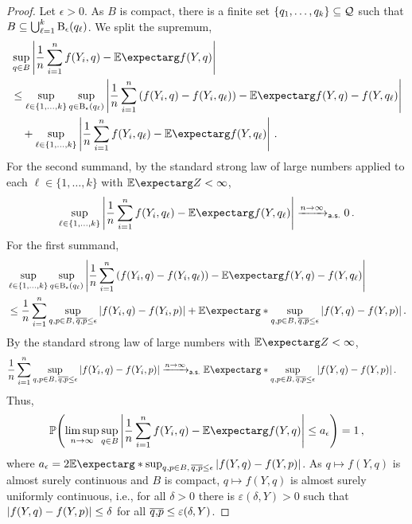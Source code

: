 \begin{proof}
Let $\epsilon > 0$. As $B$ is compact, there is a finite set $\left\lbrace q_1, \dots, q_k \right\rbrace \subseteq \mathcal{Q}$ such that $B \subseteq \bigcup_{\ell=1}^k\operatorname{\mathrm{B}}_\epsilon(q_\ell)$. We split the supremum,
\begin{align*}
	&\sup_{q\in B} \abs{\frac 1n \sum_{i=1}^n f(Y_i, q) - \Ex{f(Y, q)}}
	\\&\leq
	\sup_{\ell \in \cb{1,\dots, k}} 
	\sup_{q\in \ball_\epsilon(q_\ell)}  
		\abs{\frac 1n \sum_{i=1}^n \br{f(Y_i, q) - f(Y_i, q_\ell)} - \Ex{f(Y, q) - f(Y, q_\ell)}} 
	\\&\quad+ 
	\sup_{\ell \in \cb{1,\dots, k}} \abs{\frac 1n \sum_{i=1}^n f(Y_i, q_\ell) - \Ex{f(Y, q_\ell)}}
	\eqfs
\end{align*}
For the second summand, by the standard strong law of large numbers applied to each $\ell\in\{1,\dots,k\}$ with $\Ex{Z} < \infty$, 
\begin{align*}
\sup_{\ell \in \cb{1,\dots, k}} \abs{\frac 1n \sum_{i=1}^n f(Y_i, q_\ell) - \Ex{f(Y, q_\ell)}} \xrightarrow{n \to \infty}_{\ms{a.s.}} 0
\eqfs
\end{align*}
For the first summand,
\begin{align*}
	&\sup_{\ell \in \cb{1,\dots, k}} 
	\sup_{q\in \ball_\epsilon(q_\ell)}  
		\abs{\frac 1n \sum_{i=1}^n \br{f(Y_i, q) - f(Y_i, q_\ell)} - \Ex{f(Y, q) - f(Y, q_\ell)}} 
	\\& \leq
	\frac 1n \sum_{i=1}^n \sup_{q,p\in B,\, \sol qp \leq \epsilon} \abs{f(Y_i, q) - f(Y_i, p)} 
	+ 
	\Ex*{\sup_{q,p\in B,\, \sol qp \leq \epsilon} \abs{f(Y, q) - f(Y, p)}} 
	\eqfs
\end{align*}
By the standard strong law of large numbers with $\Ex{Z} < \infty$, 
\begin{align*}
	\frac 1n \sum_{i=1}^n \sup_{q,p\in B,\, \sol qp \leq \epsilon} \abs{f(Y_i, q) - f(Y_i, p)} 
	&\xrightarrow{n \to \infty}_{\ms{a.s.}} 
	\Ex*{\sup_{q,p\in B,\, \sol qp \leq \epsilon} \abs{f(Y, q) - f(Y, p)} }
	\eqfs
\end{align*}
Thus,
\begin{equation}\label{eq:ulln:as_limsup}
	\PrOf{
		\limsup_{n\to\infty} \sup_{q\in B} \abs{\frac 1n \sum_{i=1}^n f(Y_i, q) - \Ex{f(Y, q)}}
		\leq
		a_\epsilon
	} = 1
	\eqcm
\end{equation}
where $a_\epsilon = 2 \Ex*{\sup_{q,p\in B,\, \sol qp \leq \epsilon} \abs{f(Y, q) - f(Y, p)} }$.
As $q \mapsto f(Y, q)$ is almost surely continuous and $B$ is compact, $q \mapsto f(Y, q)$ is almost surely uniformly continuous, i.e., for all $\delta > 0$ there is $\varepsilon(\delta, Y) > 0$ such that $\left| f(Y,q)-f(Y,p) \right| \leq \delta$ for all $\overline{q,\!p} \leq \varepsilon(\delta, Y)$.

\end{proof}
